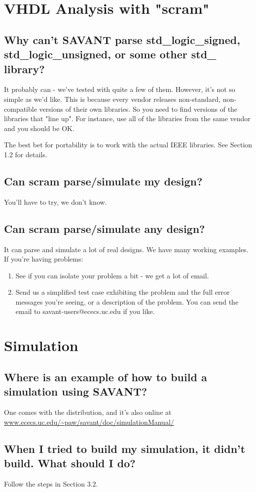 \documentclass[11pt]{article}
\begin{document}
\section{VHDL Analysis with "scram"}

\subsection{ Why can't SAVANT parse std\_logic\_signed, std\_logic\_unsigned, 
or some other std\_ library?}

It probably can - we've tested with quite a few of them. However, it's not
so simple as we'd like. This is because every vendor releases non-standard,
non-compatible versions of their own libraries. So you need to find versions
of the libraries that "line up". For instance, use all of the libraries from
the same vendor and you should be OK.

The best bet for portability is to work with the actual IEEE libraries. See
Section 1.2 for details.

\subsection{Can scram parse/simulate my design?}

You'll have to try, we don't know.

\subsection{Can scram parse/simulate any design?}

It can parse and simulate a lot of real designs. We have many working
examples. If you're having problems:
\begin{enumerate}
\item See if you can isolate your problem a bit - we get a lot of email.
\item Send us a simplified test case exhibiting the problem and the full error
messages you're seeing, or a description of the problem. You can send the
email to savant-users@ececs.uc.edu if you like.
\end{enumerate}

\section{Simulation}

\subsection{Where is an example of how to build a simulation using SAVANT?}

One comes with the distribution, and it's also online at
\url{www.ececs.uc.edu/~paw/savant/doc/simulationManual/}

\subsection{When I tried to build my simulation, it didn't build. What should I
do?}

Follow the steps in Section 3.2.
\end{document}
